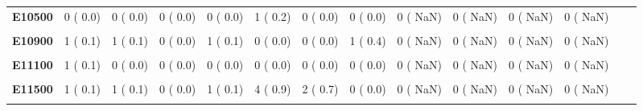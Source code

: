 \documentclass[
]{article}
\begin{document}
\begin{table}[H]
\begin{tabular}[t]{>{\raggedright\arraybackslash}p{5em}ccccccccccccc}
\textbf{E10500} & 0 (  0.0) & 0 (  0.0) & 0 (  0.0) & 0 (  0.0) & 1 (  0.2) & 0 (  0.0) & 0 (  0.0) & 0 (  NaN) & 0 (  NaN) & 0 (  NaN) & 0 (  NaN) &  & \\
\textbf{\cellcolor{gray!10}{E10700}} & \cellcolor{gray!10}{0 (  0.0)} & \cellcolor{gray!10}{1 (  0.1)} & \cellcolor{gray!10}{0 (  0.0)} & \cellcolor{gray!10}{0 (  0.0)} & \cellcolor{gray!10}{0 (  0.0)} & \cellcolor{gray!10}{0 (  0.0)} & \cellcolor{gray!10}{0 (  0.0)} & \cellcolor{gray!10}{0 (  NaN)} & \cellcolor{gray!10}{0 (  NaN)} & \cellcolor{gray!10}{0 (  NaN)} & \cellcolor{gray!10}{0 (  NaN)} & \cellcolor{gray!10}{} & \cellcolor{gray!10}{}\\
\textbf{E10900} & 1 (  0.1) & 1 (  0.1) & 0 (  0.0) & 1 (  0.1) & 0 (  0.0) & 0 (  0.0) & 1 (  0.4) & 0 (  NaN) & 0 (  NaN) & 0 (  NaN) & 0 (  NaN) &  & \\
\textbf{\cellcolor{gray!10}{E11000}} & \cellcolor{gray!10}{0 (  0.0)} & \cellcolor{gray!10}{0 (  0.0)} & \cellcolor{gray!10}{0 (  0.0)} & \cellcolor{gray!10}{1 (  0.1)} & \cellcolor{gray!10}{0 (  0.0)} & \cellcolor{gray!10}{0 (  0.0)} & \cellcolor{gray!10}{0 (  0.0)} & \cellcolor{gray!10}{0 (  NaN)} & \cellcolor{gray!10}{0 (  NaN)} & \cellcolor{gray!10}{0 (  NaN)} & \cellcolor{gray!10}{0 (  NaN)} & \cellcolor{gray!10}{} & \cellcolor{gray!10}{}\\
\textbf{E11100} & 1 (  0.1) & 0 (  0.0) & 0 (  0.0) & 0 (  0.0) & 0 (  0.0) & 0 (  0.0) & 0 (  0.0) & 0 (  NaN) & 0 (  NaN) & 0 (  NaN) & 0 (  NaN) &  & \\
\textbf{\cellcolor{gray!10}{E11200}} & \cellcolor{gray!10}{2 (  0.2)} & \cellcolor{gray!10}{5 (  0.5)} & \cellcolor{gray!10}{2 (  0.2)} & \cellcolor{gray!10}{8 (  1.1)} & \cellcolor{gray!10}{1 (  0.2)} & \cellcolor{gray!10}{2 (  0.7)} & \cellcolor{gray!10}{0 (  0.0)} & \cellcolor{gray!10}{0 (  NaN)} & \cellcolor{gray!10}{0 (  NaN)} & \cellcolor{gray!10}{0 (  NaN)} & \cellcolor{gray!10}{0 (  NaN)} & \cellcolor{gray!10}{} & \cellcolor{gray!10}{}\\
\textbf{E11500} & 1 (  0.1) & 1 (  0.1) & 0 (  0.0) & 1 (  0.1) & 4 (  0.9) & 2 (  0.7) & 0 (  0.0) & 0 (  NaN) & 0 (  NaN) & 0 (  NaN) & 0 (  NaN) &  & \\
\textbf{\cellcolor{gray!10}{E11700}} & \cellcolor{gray!10}{2 (  0.2)} & \cellcolor{gray!10}{8 (  0.8)} & \cellcolor{gray!10}{2 (  0.2)} & \cellcolor{gray!10}{3 (  0.4)} & \cellcolor{gray!10}{0 (  0.0)} & \cellcolor{gray!10}{0 (  0.0)} & \cellcolor{gray!10}{0 (  0.0)} & \cellcolor{gray!10}{0 (  NaN)} & \cellcolor{gray!10}{0 (  NaN)} & \cellcolor{gray!10}{0 (  NaN)} & \cellcolor{gray!10}{0 (  NaN)} & \cellcolor{gray!10}{} & \cellcolor{gray!10}{}\\

\end{tabular}
\end{table}
\end{document}
